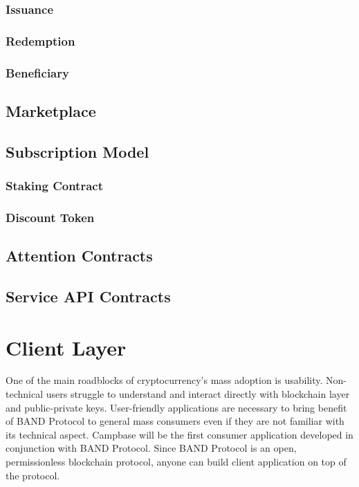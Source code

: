 \documentclass[letterpaper,11pt]{article}
\begin{document}
\subsubsection{Issuance}

\subsubsection{Redemption}

\subsubsection{Beneficiary}

\subsection{Marketplace}

\subsection{Subscription Model}

\subsubsection{Staking Contract}

\subsubsection{Discount Token}

\subsection{Attention Contracts}

\subsection{Service API Contracts}

\section{Client Layer}
One of the main roadblocks of cryptocurrency's mass adoption is usability. Non-technical users struggle to understand and interact directly with blockchain layer and public-private keys. User-friendly applications are necessary to bring benefit of BAND Protocol to general mass consumers even if they are not familiar with its technical aspect. Campbase will be the first consumer application developed in conjunction with BAND Protocol. Since BAND Protocol is an open, permissionless blockchain protocol, anyone can build client application on top of the protocol.
\end{document}
